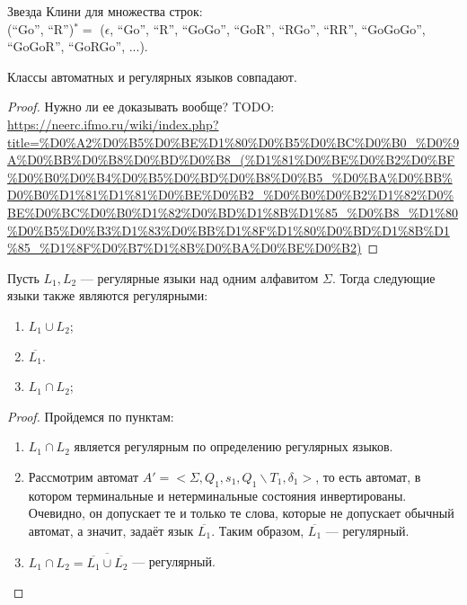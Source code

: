     \begin{Example}
        Звезда Клини для множества строк:\\ (``Go'', ``R'')$^* = $
        ($\epsilon$, ``Go'', ``R'', ``GoGo'', ``GoR'', ``RGo'', ``RR'', ``GoGoGo'', ``GoGoR'', ``GoRGo'', ...).
    \end{Example}
    \begin{Thm}
        Классы автоматных и регулярных языков совпадают.
    \end{Thm}
    \begin{proof}
        Нужно ли ее доказывать вообще? TODO: \url{https://neerc.ifmo.ru/wiki/index.php?title=%D0%A2%D0%B5%D0%BE%D1%80%D0%B5%D0%BC%D0%B0_%D0%9A%D0%BB%D0%B8%D0%BD%D0%B8_(%D1%81%D0%BE%D0%B2%D0%BF%D0%B0%D0%B4%D0%B5%D0%BD%D0%B8%D0%B5_%D0%BA%D0%BB%D0%B0%D1%81%D1%81%D0%BE%D0%B2_%D0%B0%D0%B2%D1%82%D0%BE%D0%BC%D0%B0%D1%82%D0%BD%D1%8B%D1%85_%D0%B8_%D1%80%D0%B5%D0%B3%D1%83%D0%BB%D1%8F%D1%80%D0%BD%D1%8B%D1%85_%D1%8F%D0%B7%D1%8B%D0%BA%D0%BE%D0%B2)}
    \end{proof}
    \begin{Thm}
        Пусть $L_1, L_2$ --- регулярные языки над одним алфавитом $\Sigma$. Тогда следующие языки также являются регулярными:
        \begin{enumerate}
            \item $L_1 \cup L_2$;
            \item $\overline{L_1}$.
            \item $L_1 \cap L_2$;
        \end{enumerate}
    \end{Thm}
    \begin{proof}
        Пройдемся по пунктам:
        \begin{enumerate}
            \item $L_1 \cap L_2$ является регулярным по определению регулярных языков.
            \item Рассмотрим автомат $A' = <\Sigma, Q_1, s_1,Q_1 \backslash T_1,\delta_1>$, то есть автомат, в котором терминальные и нетерминальные состояния инвертированы. Очевидно, он допускает те и только те слова, которые не допускает обычный автомат, а значит, задаёт язык $\overline{L_1}$. Таким образом, $\overline{L_1}$ --- регулярный.
            \item $L_1 \cap L_2 = \overline{\overline{L_1} \cup \overline{L_2}}$ --- регулярный.
        \end{enumerate}
    \end{proof}

